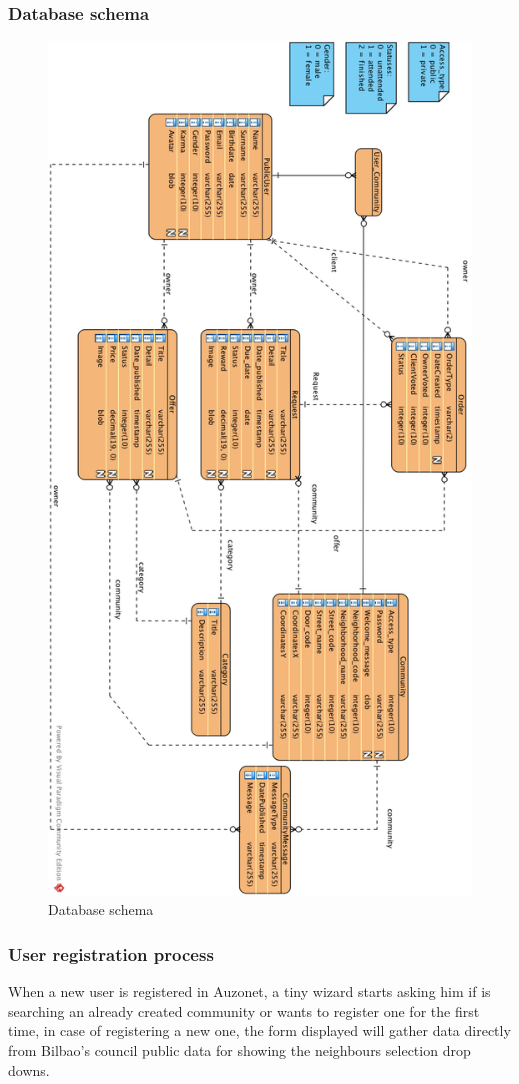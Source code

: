 \documentclass{DeustoFDP}
\begin{document}
\subsubsection{Database schema}
\begin{figure}[h!]
\centering
\includegraphics[width=0.7\linewidth]{fig/DatabaseUML}
\caption[Database schema]{Database schema}
\label{fig:DatabaseUML}
\end{figure}
\newpage
\subsubsection{User registration process}
When a new user is registered in Auzonet, a tiny wizard starts asking him if is searching an already created community or wants to register one for the first time, in case of registering a new one, the form displayed will gather data directly from Bilbao's council public data for showing the neighbours selection drop downs.
\end{document}
